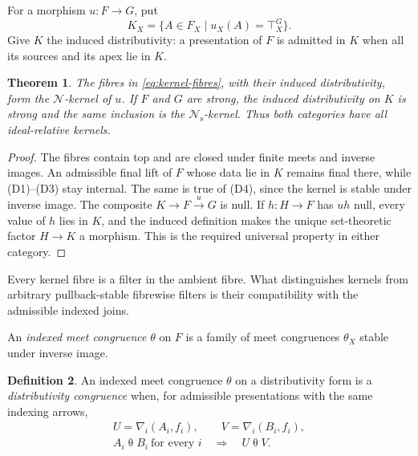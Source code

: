 \documentclass[12pt,oneside,reqno]{amsart}
\newtheorem{theorem}{Theorem}[section]
\theoremstyle{definition}
\newtheorem{definition}[theorem]{Definition}
\theoremstyle{remark}
\newcommand{\Null}{\mathcal N}
\begin{document}
For a morphism \(u:F\to G\), put
\begin{equation}\label{eq:kernel-fibres}
              K_X=\{A\in F_X\mid u_X(A)=\top_X^G\}.
\end{equation}
Give \(K\) the induced distributivity: a presentation of \(F\) is
admitted in \(K\) when all its sources and its apex lie in \(K\).

\begin{theorem}\label{thm:kernels}
The fibres in \eqref{eq:kernel-fibres}, with their induced
distributivity, form the \(\Null\)-kernel of \(u\).  If \(F\) and \(G\)
are strong, the induced distributivity on \(K\) is strong and the same
inclusion is the \(\Null_{\mathrm s}\)-kernel.  Thus both categories have
all ideal-relative kernels.
\end{theorem}

\begin{proof}
The fibres contain top and are closed under finite meets and inverse
images.  An admissible final lift of \(F\) whose data lie in \(K\)
remains final there, while (D1)--(D3) stay internal.  The same is true of
(D4), since the kernel is stable under inverse image.  The composite
\(K\to F\xrightarrow{u}G\) is null.  If \(h:H\to F\) has \(uh\) null,
every value of \(h\) lies in \(K\), and the induced definition makes the
unique set-theoretic factor \(H\to K\) a morphism.  This is the required
universal property in either category.
\end{proof}

Every kernel fibre is a filter in the ambient fibre.  What distinguishes
kernels from arbitrary pullback-stable fibrewise filters is their
compatibility with the admissible indexed joins.

An \emph{indexed meet congruence} \(\theta\) on \(F\) is a family of
meet congruences \(\theta_X\) stable under inverse image.

\begin{definition}\label{def:distributivity-congruence}
An indexed meet congruence \(\theta\) on a distributivity form is a
\emph{distributivity congruence} when, for admissible presentations with
the same indexing arrows,
\[
 \begin{gathered}
 U=\nabla_i(A_i,f_i),\qquad
 V=\nabla_i(B_i,f_i),\\
 A_i\mathrel\theta B_i\ \text{for every }i
 \quad\Longrightarrow\quad U\mathrel\theta V.
 \end{gathered}
\]
\end{definition}
\end{document}
